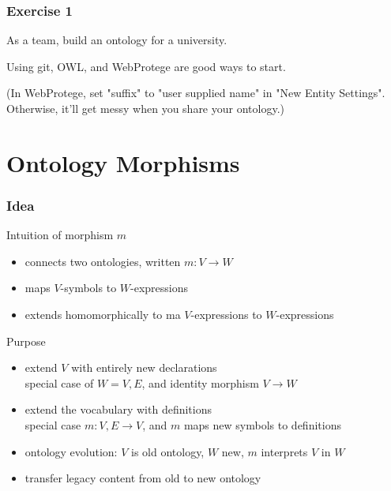 \begin{frame}\frametitle{Exercise 1}
As a team, build an ontology for a university.

Using git, OWL, and WebProtege are good ways to start.
\bigskip

{\small (In WebProtege, set "suffix" to "user supplied name" in "New Entity Settings". Otherwise, it'll get messy when you share your ontology.)}
\end{frame}

\section{Ontology Morphisms}

\begin{frame}\frametitle{Idea}
Intuition of morphism $m$
\begin{itemize}
\item connects two ontologies, written $m:V\to W$
\item maps $V$-symbols to $W$-expressions
\item extends homomorphically to ma $V$-expressions to $W$-expressions
\end{itemize}

Purpose
\begin{itemize}
\item extend $V$ with entirely new declarations \\
  special case of $W=V,E$, and identity morphism $V\to W$
\item extend the vocabulary with definitions \\
   special case $m:V,E\to V$, and $m$ maps new symbols to definitions
\item ontology evolution: $V$ is old ontology, $W$ new, $m$ interprets $V$ in $W$
\item transfer legacy content from old to new ontology
\end{itemize}
\end{frame}

